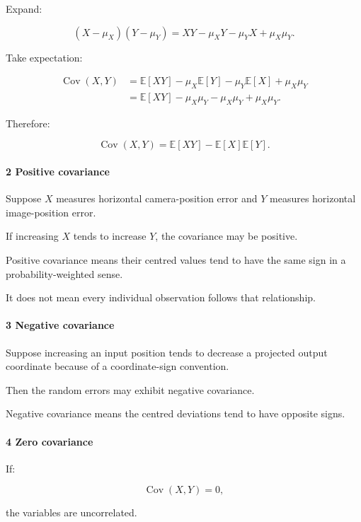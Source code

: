 Expand:

\[
 (X-\mu_X)(Y-\mu_Y) = XY-\mu_XY-\mu_YX+\mu_X\mu_Y.
\]

Take expectation:

\[
 \begin{aligned} \operatorname{Cov}(X,Y) &=\mathbb E[XY] -\mu_X\mathbb E[Y] -\mu_Y\mathbb E[X] +\mu_X\mu_Y\\ &=\mathbb E[XY] -\mu_X\mu_Y-\mu_X\mu_Y+\mu_X\mu_Y. \end{aligned}
\]

Therefore:

\[
 \boxed{ \operatorname{Cov}(X,Y) = \mathbb E[XY]-\mathbb E[X]\mathbb E[Y] }.
\]

\paragraph{2 Positive covariance}\label{positive-covariance}

Suppose \(X\) measures horizontal camera-position error and \(Y\) measures horizontal image-position error.

If increasing \(X\) tends to increase \(Y\), the covariance may be positive.

Positive covariance means their centred values tend to have the same sign in a probability-weighted sense.

It does not mean every individual observation follows that relationship.

\paragraph{3 Negative covariance}\label{negative-covariance}

Suppose increasing an input position tends to decrease a projected output coordinate because of a coordinate-sign convention.

Then the random errors may exhibit negative covariance.

Negative covariance means the centred deviations tend to have opposite signs.

\paragraph{4 Zero covariance}\label{zero-covariance}

If:

\[
 \operatorname{Cov}(X,Y)=0,
\]

the variables are uncorrelated.

